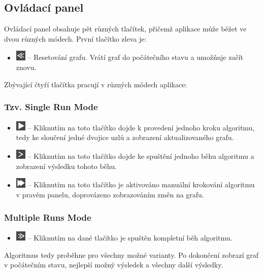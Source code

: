 \documentclass[../projekt.tex]{subfiles}
\begin{document}
\subsection{Ovládací panel}

Ovládací panel obsahuje pět různých tlačítek, přičemž aplikace může běžet
ve dvou různých módech. První tlačítko zleva je:  

\begin{itemize}
    \item[] \includegraphics[height=1.3em]{obrazky-figures/resetSmall.png} -- Resetování grafu.
    Vrátí graf do počátečního stavu a umožňuje začít znovu. 
\end{itemize}

\newpage

\noindent Zbývající čtyří tlačítka pracují v různých módech aplikace:

\subsubsection {Tzv. Single Run Mode}

\begin{itemize}
    \item[] \includegraphics[height=1.3em]{obrazky-figures/playSmall.png} -- Kliknutím na toto tlačítko dojde k provedení jednoho kroku algoritmu, tedy ke sloučení jedné dvojice uzlů a zobrazení aktualizovaného grafu.
    \item[] \includegraphics[height=1.3em]{obrazky-figures/nextStepSmall.png} -- Kliknutím na toto tlačítko dojde ke spuštění jednoho běhu algoritmu a zobrazení výsledku tohoto běhu.
    \item[] \includegraphics[height=1.3em]{obrazky-figures/manualSteps.png} -- Kliknutím na toto tlačítko je aktivováno manuální krokování algoritmu v pravém panelu, doprovázeno zobrazováním změn na grafu.
\end{itemize}

\subsubsection{Multiple Runs Mode}

\begin{itemize}
	\item[] \includegraphics[height=1.3em]{obrazky-figures/finishSmall.png} -- Kliknutím na dané tlačítko je spuštěn kompletní běh algoritmu.
\end{itemize}
Algoritmus tedy proběhne pro všechny možné varianty. Po dokončení zobrazí graf v počátečním stavu, nejlepší možný výsledek a všechny další výsledky.
\end{document}

